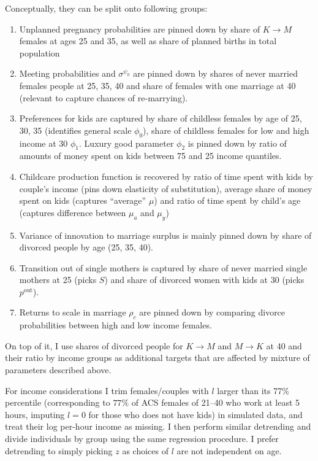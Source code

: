 \documentclass[12pt,letter]{article}
\begin{document}
Conceptually, they can be split onto following groups:
\begin{enumerate}
\item Unplanned pregnancy probabilities are pinned down by share of $K\to M$ females at ages 25 and 35, as well as share of planned births in total population
\item Meeting probabilities and $\sigma^{\psi_0}$ are pinned down by shares of never married females people at 25, 35, 40 and share of females with one marriage at 40 (relevant to capture chances of re-marrying).
\item  Preferences for kids are captured by share of childless females by age of 25, 30, 35 (identifies general scale $\phi_0$), share of childless females for low and high income at 30 $\phi_1$. Luxury good parameter $\phi_2$ is pinned down by ratio of amounts of money spent on kids between 75 and 25 income quantiles.
\item Childcare production function is recovered by ratio of time spent with kids by couple's income (pins down elasticity of substitution), average share of money spent on kids (captures ``average'' $\mu$) and ratio of time spent by child's age (captures difference between $\mu_a$ and $\mu_y$)
\item Variance of innovation to marriage surplus is mainly pinned down by share of divorced people by age (25, 35, 40).
\item Transition out of single mothers is captured by share of never married single mothers at 25 (picks $S$) and share of divorced women with kids at 30 (picks $p^{\text{out}}$).
\item Returns to scale in marriage $\rho_c$ are pinned down by comparing divorce probabilities between high and low income females.
\end{enumerate}
On top of it, I use shares of divorced people for $K\to M$ and $M \to K$ at 40 and their ratio by income groups as additional targets that are affected by mixture of parameters described above.

For income considerations I trim females/couples with $l$ larger than its 77\% percentile (corresponding to $77\%$ of ACS females of 21--40 who work at least 5 hours, imputing $l = 0$ for those who does not have kids) in simulated data, and treat their log per-hour income as missing. I then perform similar detrending and divide individuals by group using the same regression procedure. I prefer detrending to simply picking $z$ as choices of $l$ are not independent on age.
  
\end{document}

